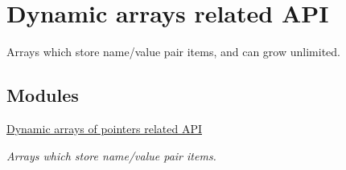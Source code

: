 \hypertarget{group__DYNAMIC__ARRAYS}{
\section{Dynamic arrays related API}
\label{group__DYNAMIC__ARRAYS}
}


Arrays which store name/value pair items, and can grow unlimited.  
\subsection*{Modules}
\begin{DoxyCompactItemize}
\item 
\hyperlink{group__PTR__DYNAMIC__ARRAYS}{Dynamic arrays of pointers related API}


\begin{DoxyCompactList}\small\item\em Arrays which store name/value pair items. \item\end{DoxyCompactList}\end{DoxyCompactItemize}
